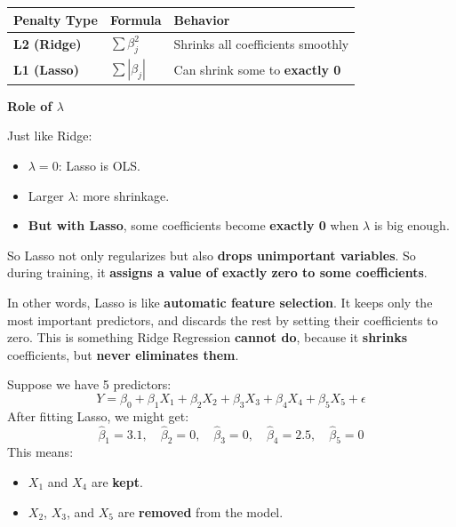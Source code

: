 \begin{table}[!htp]
    \centering
    \begin{tabular}{@{} l l l @{}}
        \toprule
        Penalty Type        & Formula                                   & Behavior \\
        \midrule
        \textbf{L2 (Ridge)} & $\displaystyle\sum \beta_j^2$             & Shrinks all coefficients smoothly \\ [.3em]
        \textbf{L1 (Lasso)} & $\displaystyle\sum \left|\beta_j\right|$  & Can shrink some to \textbf{exactly 0} \\
        \bottomrule
    \end{tabular}
\end{table}

\highspace
\begin{flushleft}
    \textcolor{Green3}{ \textbf{Role of $\lambda$}}
\end{flushleft}
Just like Ridge:
\begin{itemize}
    \item $\lambda = 0$: Lasso is OLS.
    \item Larger $\lambda$: more shrinkage.
    \item \textbf{But with Lasso}, some coefficients become \textbf{exactly 0} when $\lambda$ is big enough.
\end{itemize}
So Lasso not only regularizes but also \textbf{drops unimportant variables}. So during training, it \textbf{assigns a value of exactly zero to some coefficients}.

\highspace
In other words, Lasso is like \textbf{automatic feature selection}. It keeps only the most important predictors, and discards the rest by setting their coefficients to zero. This is something Ridge Regression \textbf{cannot do}, because it \textbf{shrinks} coefficients, but \textbf{never eliminates them}.

\begin{examplebox}[: Lasso]
    Suppose we have 5 predictors:
    \begin{equation*}
        Y = \beta_0 + \beta_1 X_1 + \beta_2 X_2 + \beta_3 X_3 + \beta_4 X_4 + \beta_5 X_5 + \epsilon
    \end{equation*}
    After fitting Lasso, we might get:
    \begin{equation*}
        \hat{\beta}_1 = 3.1,\quad \hat{\beta}_2 = 0,\quad \hat{\beta}_3 = 0,\quad \hat{\beta}_4 = 2.5,\quad \hat{\beta}_5 = 0
    \end{equation*}
    This means:
    \begin{itemize}
        \item $X_1$ and $X_4$ are \textbf{kept}.
        \item $X_2$, $X_3$, and $X_5$ are \textbf{removed} from the model.
    \end{itemize}
\end{examplebox}

